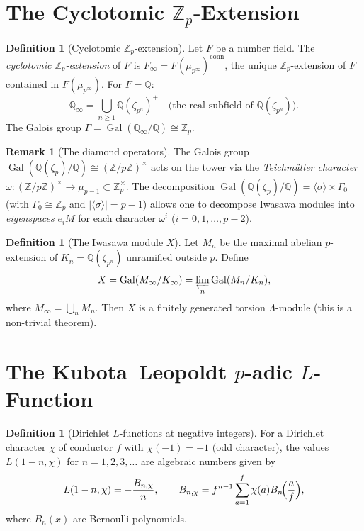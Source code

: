 \documentclass[12pt,a4paper]{amsart}
\theoremstyle{definition}
\newtheorem{definition}[theorem]{Definition}
\newtheorem{remark}[theorem]{Remark}
\newcommand{\Z}{\mathbb{Z}}
\newcommand{\Q}{\mathbb{Q}}
\newcommand{\Zp}{\mathbb{Z}_p}
\DeclareMathOperator{\Gal}{Gal}
\begin{document}
\section{The Cyclotomic $\Zp$-Extension}

\begin{definition}[Cyclotomic $\Zp$-extension]
\label{def:cyclotomic_ext}
Let $F$ be a number field.  The \emph{cyclotomic $\Zp$-extension} of $F$
is $F_\infty = F(\mu_{p^\infty})^{\mathrm{conn}}$, the unique $\Zp$-extension
of $F$ contained in $F(\mu_{p^\infty})$.  For $F = \Q$:
\[
  \Q_\infty = \bigcup_{n \ge 1} \Q(\zeta_{p^n})^+
  \quad\text{(the real subfield of $\Q(\zeta_{p^n})$)}.
\]
The Galois group $\Gamma = \Gal(\Q_\infty/\Q) \cong \Zp$.
\end{definition}

\begin{remark}[The diamond operators]
The Galois group $\Gal(\Q(\zeta_p)/\Q) \cong (\Z/p\Z)^\times$ acts on
the tower via the \emph{Teichmüller character}
$\omega : (\Z/p\Z)^\times \to \mu_{p-1} \subset \Zp^\times$.
The decomposition $\Gal(\Q(\zeta_p)/\Q) = \langle\sigma\rangle \times \Gamma_0$
(with $\Gamma_0 \cong \Zp$ and $|\langle\sigma\rangle| = p-1$) allows one to
decompose Iwasawa modules into \emph{eigenspaces} $e_i M$ for each character
$\omega^i$ ($i = 0, 1, \ldots, p-2$).
\end{remark}

\begin{definition}[The Iwasawa module $X$]
Let $M_n$ be the maximal abelian $p$-extension of $K_n = \Q(\zeta_{p^n})$
unramified outside $p$.  Define
\[
  X = \Gal(M_\infty / K_\infty)
  = \varprojlim_n \Gal(M_n/K_n),
\]
where $M_\infty = \bigcup_n M_n$.  Then $X$ is a finitely generated
torsion $\Lambda$-module (this is a non-trivial theorem).
\end{definition}

\section{The Kubota--Leopoldt $p$-adic $L$-Function}

\begin{definition}[Dirichlet $L$-functions at negative integers]
For a Dirichlet character $\chi$ of conductor $f$ with $\chi(-1) = -1$
(odd character), the values $L(1-n, \chi)$ for $n = 1, 2, 3, \ldots$ are
algebraic numbers given by
\[
  L(1-n, \chi) = -\frac{B_{n,\chi}}{n},
  \qquad
  B_{n,\chi} = f^{n-1} \sum_{a=1}^{f} \chi(a) B_n\!\Bigl(\frac{a}{f}\Bigr),
\]
where $B_n(x)$ are Bernoulli polynomials.
\end{definition}
\end{document}
